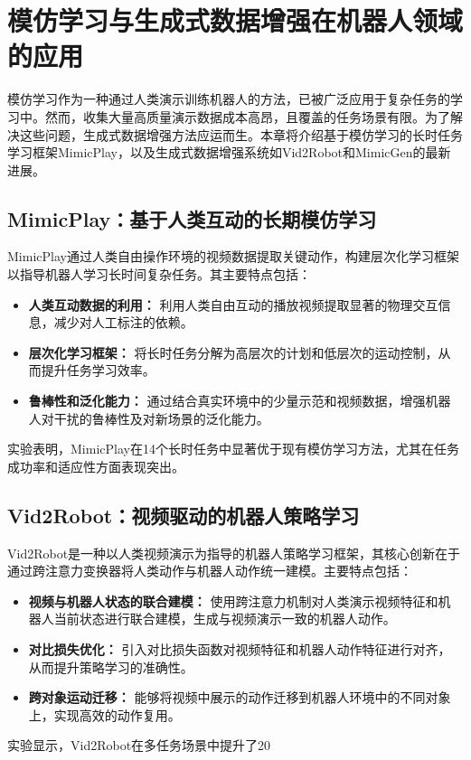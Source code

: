 \documentclass[a4paper]{article}
\begin{document}
\section{模仿学习与生成式数据增强在机器人领域的应用}

模仿学习作为一种通过人类演示训练机器人的方法，已被广泛应用于复杂任务的学习中。然而，收集大量高质量演示数据成本高昂，且覆盖的任务场景有限。为了解决这些问题，生成式数据增强方法应运而生。本章将介绍基于模仿学习的长时任务学习框架MimicPlay，以及生成式数据增强系统如Vid2Robot和MimicGen的最新进展。

\subsection{MimicPlay：基于人类互动的长期模仿学习}
MimicPlay通过人类自由操作环境的视频数据提取关键动作，构建层次化学习框架以指导机器人学习长时间复杂任务。其主要特点包括：
\begin{itemize}
    \item \textbf{人类互动数据的利用：} 利用人类自由互动的播放视频提取显著的物理交互信息，减少对人工标注的依赖。
    \item \textbf{层次化学习框架：} 将长时任务分解为高层次的计划和低层次的运动控制，从而提升任务学习效率。
    \item \textbf{鲁棒性和泛化能力：} 通过结合真实环境中的少量示范和视频数据，增强机器人对干扰的鲁棒性及对新场景的泛化能力。
\end{itemize}
实验表明，MimicPlay在14个长时任务中显著优于现有模仿学习方法，尤其在任务成功率和适应性方面表现突出。

\subsection{Vid2Robot：视频驱动的机器人策略学习}
Vid2Robot是一种以人类视频演示为指导的机器人策略学习框架，其核心创新在于通过跨注意力变换器将人类动作与机器人动作统一建模。主要特点包括：
\begin{itemize}
    \item \textbf{视频与机器人状态的联合建模：} 使用跨注意力机制对人类演示视频特征和机器人当前状态进行联合建模，生成与视频演示一致的机器人动作。
    \item \textbf{对比损失优化：} 引入对比损失函数对视频特征和机器人动作特征进行对齐，从而提升策略学习的准确性。
    \item \textbf{跨对象运动迁移：} 能够将视频中展示的动作迁移到机器人环境中的不同对象上，实现高效的动作复用。
\end{itemize}
实验显示，Vid2Robot在多任务场景中提升了20%
\end{document}
